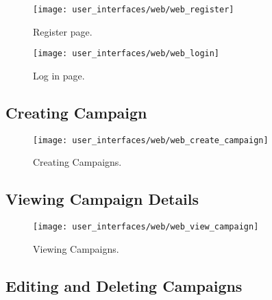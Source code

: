 \begin{figure}[!htbp]
\centering
\texttt{[image: user\_interfaces/web/web\_register]}
\caption{Register page.}
\label{fig:web_register}
\end{figure}
\FloatBarrier

\begin{figure}[!htbp]
\centering
\texttt{[image: user\_interfaces/web/web\_login]}
\caption{Log in page.}
\label{fig:web_login}
\end{figure}
\FloatBarrier

\subsection{Creating Campaign}

\begin{figure}[!htbp]
\centering
\texttt{[image: user\_interfaces/web/web\_create\_campaign]}
\caption{Creating Campaigns.}
\label{fig:web_create_campaign}
\end{figure}
\FloatBarrier

\subsection{Viewing Campaign Details}

\begin{figure}[!htbp]
\centering
\texttt{[image: user\_interfaces/web/web\_view\_campaign]}
\caption{Viewing Campaigns.}
\label{fig:web_view_campaign}
\end{figure}
\FloatBarrier

\subsection{Editing and Deleting Campaigns}

